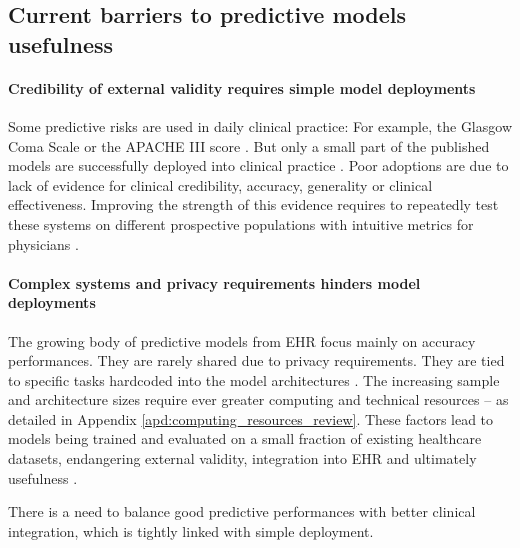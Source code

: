 \documentclass[french,12pt,twoside,a4paper]{book}
\begin{document}
\subsection{Current barriers to predictive models usefulness}%
\label{subsec:predictive_models:useful}%

\paragraph{Credibility of external validity requires simple model deployments}

Some predictive risks are used in daily clinical practice: For example, the
Glasgow Coma Scale \citep{teasdale1974assessment} or the APACHE III score
\citep{knaus1991apache}. But only a small part of the published models are
successfully deployed into clinical practice \citep{wyatt1995commentary,
  kelly2019key}. Poor adoptions are due to lack of evidence for clinical
credibility, accuracy, generality or clinical effectiveness. Improving the
strength of this evidence requires to repeatedly test these systems on
different prospective populations with intuitive metrics for physicians
\citep{kelly2019key, varoquaux2022evaluating, wornow2023shaky}.

\paragraph{Complex systems and privacy requirements hinders model deployments}
The growing body of predictive models from EHR focus mainly on accuracy
performances. They are rarely shared due to privacy requirements. They are tied
to specific tasks hardcoded into the model architectures
\citep{wornow2023shaky}. The increasing sample and architecture sizes require
ever greater computing and technical resources -- as detailed in Appendix
\ref{apd:computing_resources_review}. These factors lead to models being trained and
evaluated on a small fraction of existing healthcare datasets, endangering
external validity, integration into EHR and ultimately usefulness
\citep{sharma2021,wornow2023shaky}.

There is a need to balance good predictive performances with better clinical
integration, which is tightly linked with simple deployment.
\end{document}

